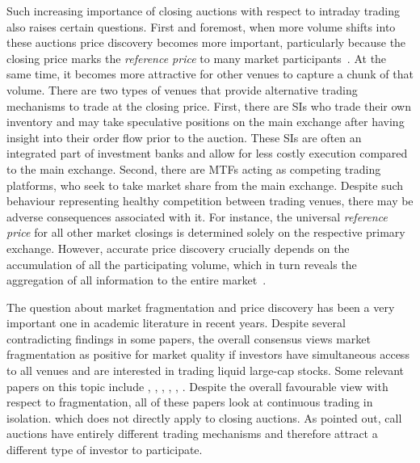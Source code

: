 \documentclass[11pt,a4paper, notitlepage]{article}
\begin{document}
	Such increasing importance of closing auctions with respect to intraday trading also raises certain questions. First and foremost, when more volume shifts into these auctions price discovery becomes more important, particularly because the closing price marks the \emph{reference price} to many market participants~\parencite{KandelRindiBosetti2012}. At the same time, it becomes more attractive for other venues to capture a chunk of that volume. There are two types of venues that provide alternative trading mechanisms to trade at the closing price. First, there are \acp{SI} who trade their own inventory and may take speculative positions on the main exchange after having insight into their order flow prior to the auction. These \acp{SI} are often an integrated part of investment banks and allow for less costly execution compared to the main exchange. Second, there are \acp{MTF} acting as competing trading platforms, who seek to take market share from the main exchange.  Despite such behaviour representing healthy competition between trading venues, there may be adverse consequences associated with it. For instance, the universal \emph{reference price} for all other market closings is determined solely on the respective primary exchange. However, accurate price discovery crucially depends on the accumulation of all the participating volume, which in turn reveals the aggregation of all information to the entire market~\parencite{Madhavan1992}.
	
	The question about market fragmentation and price discovery has been a very important one in academic literature in recent years. Despite several contradicting findings in some papers, the overall consensus views market fragmentation as positive for market quality if investors have simultaneous access to all venues and are interested in trading liquid large-cap stocks. Some relevant papers on this topic include \textcite{GomberSagadeTheissenWeberWestheide2017}, \textcite{HaslagRinggenberg2016}, \textcite{PaganoPengSchwartz2013}, \textcite{AitkenChenFoley2017}, \textcite{DegryseDeJongVanKervel2015}, \textcite{OharaYe2011}. Despite the overall favourable view with respect to fragmentation, all of these papers look at continuous trading in isolation. which does not directly apply to closing auctions. As \textcite{Madhavan1992} pointed out, call auctions have entirely different trading mechanisms and therefore attract a different type of investor to participate.
	
\end{document}
